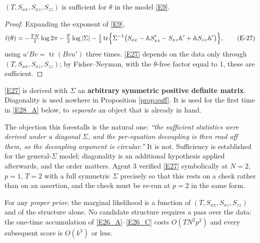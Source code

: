 \begin{proposition}[sufficiency]\label{prop:suff}
$(T,S_{xx},S_{xz},S_{zz})$ is sufficient for $\theta$ in the model \eqref{E9}.
\end{proposition}

\begin{proof}
Expanding the exponent of \eqref{E9},
\begin{equation}
\ell(\theta) = -\tfrac{TN}{2}\log 2\pi - \tfrac{T}{2}\log|\Sigma|
 - \tfrac12\operatorname{tr}\Bigl\{\Sigma^{-1}\bigl(S_{xx} - \mathbb{A} S_{xz}'
 - S_{xz}\mathbb{A}' + \mathbb{A} S_{zz}\mathbb{A}'\bigr)\Bigr\},
\tag{E-27}\label{E27}
\end{equation}
using $u'Bv=\operatorname{tr}(Bvu')$ three times. \eqref{E27} depends on the data
only through $(T,S_{xx},S_{xz},S_{zz})$; by Fisher--Neyman, with the $\theta$-free
factor equal to 1, these are sufficient.
\end{proof}

\begin{remark}\label{rem:diag}
\eqref{E27} is derived with $\Sigma$ an \textbf{arbitrary symmetric positive definite
matrix}. Diagonality is used nowhere in Proposition \ref{prop:suff}. It is used for
the first time in \eqref{E28_A} below, to \emph{separate} an object that is already in
hand.

The objection this forestalls is the natural one: \emph{``the sufficient statistics
were derived under a diagonal $\Sigma$, and the per-equation decoupling is then read
off them, so the decoupling argument is circular.''} It is not. Sufficiency is
established for the general-$\Sigma$ model; diagonality is an additional hypothesis
applied afterwards, and the order matters. Agent 3 verified \eqref{E27} symbolically
at $N=2$, $p=1$, $T=2$ with a full symmetric $\Sigma$ precisely so that this rests on
a check rather than on an assertion, and the check must be re-run at $p=2$ in the
same form.
\end{remark}

\begin{corollary}\label{cor:agn}
For any \emph{proper prior}, the marginal likelihood is a function of
$(T,S_{xx},S_{xz},S_{zz})$ and of the structure alone. No candidate structure
requires a pass over the data: the one-time accumulation of \eqref{E26_A}--\eqref{E26_C} costs
$O(TN^2p^2)$ and every subsequent score is $O(k^3)$ or less.
\end{corollary}


